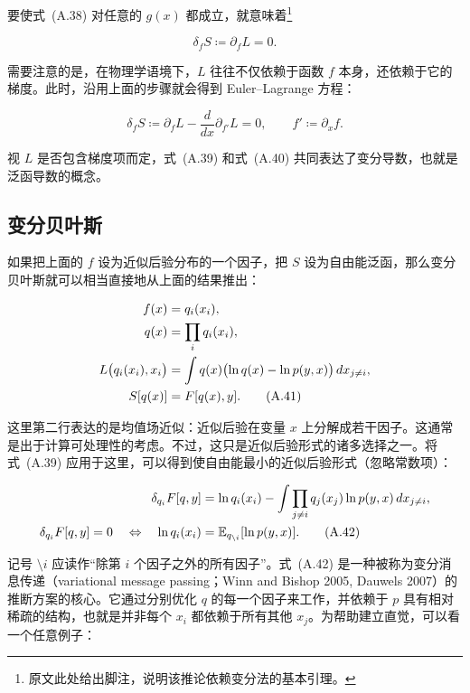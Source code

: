 要使式~(A.38) 对任意的 $g(x)$ 都成立，就意味着\footnote{原文此处给出脚注，说明该推论依赖变分法的基本引理。}

\begin{equation}
\delta_f S \coloneqq \partial_f L = 0.
\tag{A.39}
\end{equation}

需要注意的是，在物理学语境下，$L$ 往往不仅依赖于函数 $f$ 本身，还依赖于它的梯度。此时，沿用上面的步骤就会得到 Euler--Lagrange 方程：

\begin{equation}
\delta_f S \coloneqq \partial_f L - \frac{d}{dx}\partial_{f'}L = 0,
\qquad
f' \coloneqq \partial_x f.
\tag{A.40}
\end{equation}

视 $L$ 是否包含梯度项而定，式~(A.39) 和式~(A.40) 共同表达了变分导数，也就是泛函导数的概念。

\subsection{变分贝叶斯}

如果把上面的 $f$ 设为近似后验分布的一个因子，把 $S$ 设为自由能泛函，那么变分贝叶斯就可以相当直接地从上面的结果推出：

\begin{align}
f(x) &= q_i(x_i),
\notag \\
q(x) &= \prod_i q_i(x_i),
\notag \\
L\bigl(q_i(x_i),x_i\bigr)
&=
\int q(x)\bigl(\ln q(x)-\ln p(y,x)\bigr)\,dx_{j\neq i},
\notag \\
S[q(x)] &= F[q(x),y].
\tag{A.41}
\end{align}

这里第二行表达的是均值场近似：近似后验在变量 $x$ 上分解成若干因子。这通常是出于计算可处理性的考虑。不过，这只是近似后验形式的诸多选择之一。将式~(A.39) 应用于这里，可以得到使自由能最小的近似后验形式（忽略常数项）：

\begin{align}
\delta_{q_i} F[q,y]
&=
\ln q_i(x_i)
- \int \prod_{j\neq i} q_j(x_j)\ln p(y,x)\,dx_{j\neq i},
\notag \\
\delta_{q_i} F[q,y] = 0
\quad\Leftrightarrow\quad
\ln q_i(x_i)
&=
\mathbb{E}_{q_{\setminus i}}[\ln p(y,x)].
\tag{A.42}
\end{align}

记号 $\setminus i$ 应读作“除第 $i$ 个因子之外的所有因子”。式~(A.42) 是一种被称为变分消息传递（variational message passing；Winn and Bishop 2005, Dauwels 2007）的推断方案的核心。它通过分别优化 $q$ 的每一个因子来工作，并依赖于 $p$ 具有相对稀疏的结构，也就是并非每个 $x_i$ 都依赖于所有其他 $x_j$。为帮助建立直觉，可以看一个任意例子：

